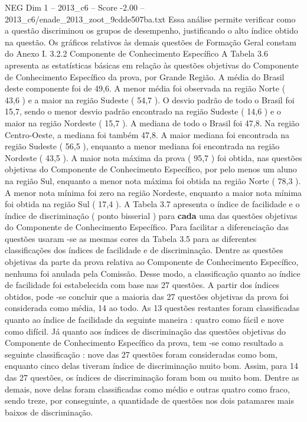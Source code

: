 \begin{textsample}{NEG Dim 1 – 2013\_c6 – Score -2.00 – 2013\_c6/enade\_2013\_zoot\_9cdde507ba.txt}
Essa análise permite verificar como a questão discriminou os grupos de desempenho, justificando o alto índice obtido na questão.
Os gráficos relativos às demais questões de Formação Geral constam do Anexo I. 3.2.2 Componente de Conhecimento Específico A Tabela 3.6 apresenta as estatísticas básicas em relação às questões objetivas do Componente de Conhecimento Específico da prova, por Grande Região.
A média do Brasil deste componente foi de 49,6.
A menor média foi observada na região Norte ( 43,6 ) e a maior na região Sudeste ( 54,7 ).
O desvio padrão de todo o Brasil foi 15,7, sendo o menor desvio padrão encontrado na região Sudeste ( 14,6 ) e o maior na região Nordeste ( 15,7 ).
A mediana de todo o Brasil foi 47,8.
Na região Centro-Oeste, a mediana foi também 47,8.
A maior mediana foi encontrada na região Sudeste ( 56,5 ), enquanto a menor mediana foi encontrada na região Nordeste ( 43,5 ).
A maior nota máxima da prova ( 95,7 ) foi obtida, nas questões objetivas do Componente de Conhecimento Específico, por pelo menos um aluno na região Sul, enquanto a menor nota máxima foi obtida na região Norte ( 78,3 ).
A menor nota mínima foi zero na região Nordeste, enquanto a maior nota mínima foi obtida na região Sul ( 17,4 ).
A Tabela 3.7 apresenta o índice de facilidade e o índice de discriminação ( ponto bisserial ) para \textbf{cada} uma das questões objetivas do Componente de Conhecimento Específico.
Para facilitar a diferenciação das questões usaram -se as mesmas cores da Tabela 3.5 para as diferentes classificações dos índices de facilidade e de discriminação.
Dentre as questões objetivas da parte da prova relativa ao Componente de Conhecimento Específico, nenhuma foi anulada pela Comissão.
Desse modo, a classificação quanto ao índice de facilidade foi estabelecida com base nas 27 questões.
A partir dos índices obtidos, pode -se concluir que a maioria das 27 questões objetivas da prova foi considerada como média, 14 ao todo.
As 13 questões restantes foram classificadas quanto ao índice de facilidade da seguinte maneira : quatro como fácil e nove como difícil.
Já quanto aos índices de discriminação das questões objetivas do Componente de Conhecimento Específico da prova, tem -se como resultado a seguinte classificação : nove das 27 questões foram consideradas como bom, enquanto cinco delas tiveram índice de discriminação muito bom.
Assim, para 14 das 27 questões, os índices de discriminação foram bom ou muito bom.
Dentre as demais, nove delas foram classificadas como médio e outras quatro como fraco, sendo treze, por conseguinte, a quantidade de questões nos dois patamares mais baixos de discriminação.

\end{textsample}
